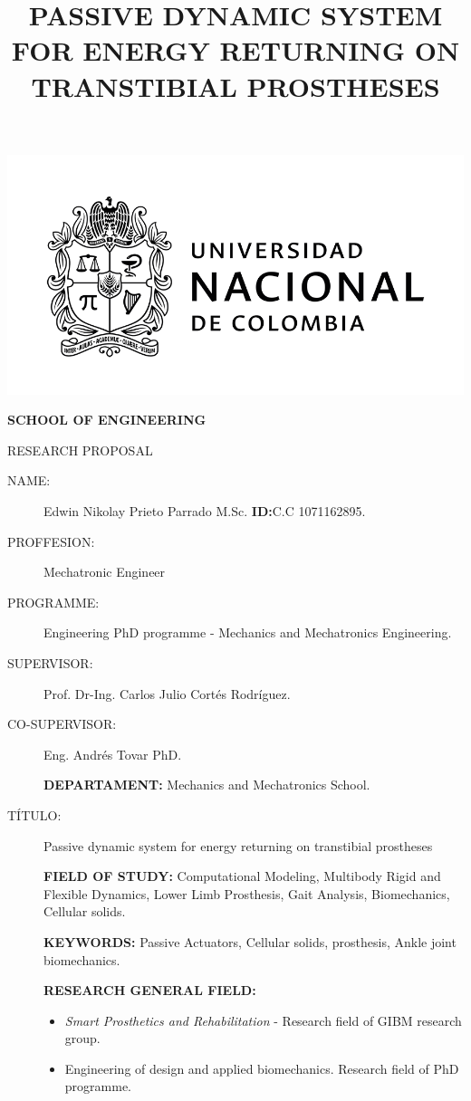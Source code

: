 \documentclass[12pt,english]{article}
\begin{document}
\begin{center}
\includegraphics[scale=0.27]{unal_logo}
\par\end{center}
\begin{center}
 \textbf{SCHOOL OF ENGINEERING}
\par\end{center}

\begin{center}
RESEARCH PROPOSAL 
\par\end{center}

\begin{description}
\item [{NAME:}] Edwin Nikolay Prieto Parrado M.Sc. \textbf{ID:}C.C 1071162895.
\item [{PROFFESION:}] Mechatronic Engineer
\item [{PROGRAMME:}] Engineering PhD programme - Mechanics and Mechatronics Engineering.
\item [{SUPERVISOR:}] Prof. Dr-Ing. Carlos Julio Cortés
Rodríguez.
\item [{CO-SUPERVISOR:}] Eng. Andrés Tovar PhD.

\textbf{DEPARTAMENT:} Mechanics and Mechatronics School.


\item [{TÍTULO:}] Passive dynamic system for energy returning on transtibial prostheses
\title{PASSIVE DYNAMIC SYSTEM FOR ENERGY RETURNING ON TRANSTIBIAL PROSTHESES} 


 \textbf{FIELD OF STUDY:} Computational Modeling, Multibody Rigid and Flexible Dynamics, Lower Limb Prosthesis, Gait Analysis, Biomechanics, Cellular solids.

\textbf{KEYWORDS:} Passive Actuators, Cellular solids, prosthesis, Ankle joint biomechanics.

 \textbf{RESEARCH GENERAL FIELD:} \begin{itemize}
\item\emph{Smart Prosthetics and Rehabilitation}
- Research field of GIBM research group.
\item Engineering of design  and applied biomechanics. Research field of PhD programme.
\end{itemize}

\end{description}
\newpage
\end{document}
